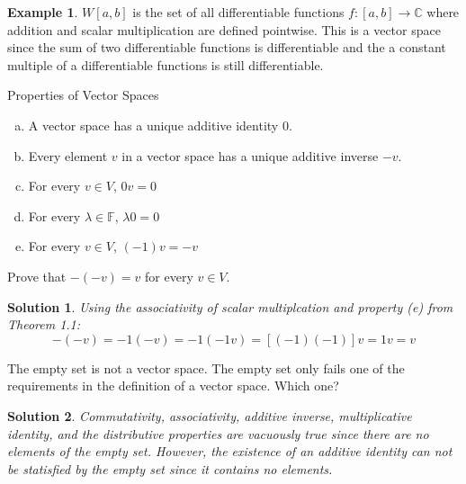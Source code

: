 \documentclass{book}
\newcommand{\complex}{\mathbb{C}}
\newcommand{\field}{\mathbb{F}}
\newtheorem*{soln}{Solution}
\theoremstyle{definition}
\newtheorem*{example}{Example}
\begin{document}
\begin{example}
    $W[a,b]$ is the set of all differentiable functions $f:[a,b]\to\complex$ 
    where addition and scalar multiplication are defined pointwise. This is a
    vector space since the sum of two differentiable functions is differentiable 
    and the a constant multiple of a differentiable functions is still
    differentiable.
\end{example}

\begin{thm}{Properties of Vector Spaces}
    \begin{enumerate}[(a)]
        \item A vector space has a unique additive identity $0$.
        \item Every element $v$ in a vector space has a unique additive inverse
            $-v$.
        \item For every $v\in V$, $0v=0$ 
        \item For every $\lambda\in\field$, $\lambda 0 = 0$ 
        \item For every $v\in V$, $(-1)v=-v$ 
    \end{enumerate}
\end{thm}

\break

\begin{problem}
    Prove that $-(-v)=v$ for every $v\in V$.
\end{problem}

\begin{soln}
    Using the associativity of scalar multiplcation and property (e) from
    Theorem 1.1:
    \begin{equation*}
        -(-v) = -1(-v) = -1(-1v) = [(-1)(-1)]v = 1v = v
    \end{equation*}
\end{soln}

\begin{problem}
    The empty set is not a vector space. The empty set only fails one of the
    requirements in the definition of a vector space. Which one?
\end{problem}

\begin{soln}
    Commutativity, associativity, additive inverse, multiplicative identity,
    and the distributive properties are vacuously true since there are no
    elements of the empty set. However, the existence of an additive identity
    can not be statisfied by the empty set since it contains no elements.
\end{soln}
\end{document}
